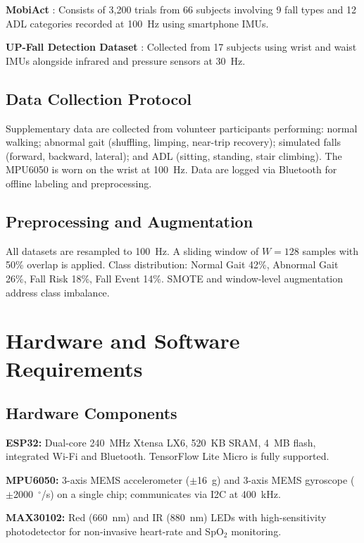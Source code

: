\documentclass[conference]{IEEEtran}
\begin{document}
\textbf{MobiAct} \cite{b31}: Consists of 3,200 trials from 66 subjects involving 9 fall types and 12 ADL categories recorded at 100~Hz using smartphone IMUs.

\textbf{UP-Fall Detection Dataset} \cite{b32}: Collected from 17 subjects using wrist and waist IMUs alongside infrared and pressure sensors at 30~Hz.

\subsection{Data Collection Protocol}

Supplementary data are collected from volunteer participants performing: normal walking; abnormal gait (shuffling, limping, near-trip recovery); simulated falls (forward, backward, lateral); and ADL (sitting, standing, stair climbing). The MPU6050 is worn on the wrist at 100~Hz. Data are logged via Bluetooth for offline labeling and preprocessing.

\subsection{Preprocessing and Augmentation}

All datasets are resampled to 100~Hz. A sliding window of $W = 128$ samples with 50\% overlap is applied. Class distribution: Normal Gait 42\%, Abnormal Gait 26\%, Fall Risk 18\%, Fall Event 14\%. SMOTE and window-level augmentation address class imbalance.

\section{Hardware and Software Requirements}

\subsection{Hardware Components}

\textbf{ESP32:} Dual-core 240~MHz Xtensa LX6, 520~KB SRAM, 4~MB flash, integrated Wi-Fi and Bluetooth. TensorFlow Lite Micro is fully supported.

\textbf{MPU6050:} 3-axis MEMS accelerometer ($\pm$16~g) and 3-axis MEMS gyroscope ($\pm$2000~$^\circ$/s) on a single chip; communicates via I2C at 400~kHz.

\textbf{MAX30102:} Red (660~nm) and IR (880~nm) LEDs with high-sensitivity photodetector for non-invasive heart-rate and SpO$_2$ monitoring.
\end{document}
